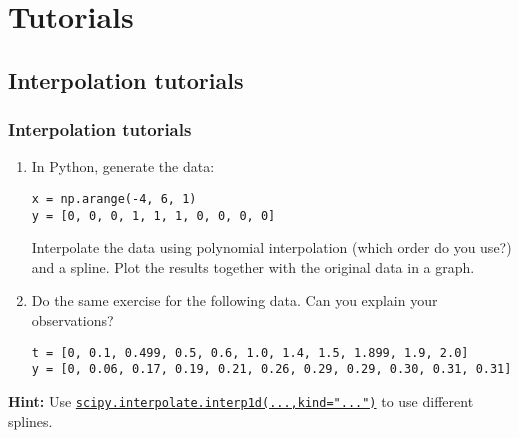 \section{Tutorials}
\subsection*{Interpolation tutorials}
\begin{frame}[fragile]
  \frametitle{Interpolation tutorials}
  \begin{enumerate}
    \item In Python, generate the data:
    \begin{lstlisting}
x = np.arange(-4, 6, 1)
y = [0, 0, 0, 1, 1, 1, 0, 0, 0, 0]
    \end{lstlisting}
    Interpolate the data using polynomial interpolation (which order do you use?) and a spline. Plot the results together with the original data in a graph.
    \item Do the same exercise for the following data. Can you explain your observations?
    \begin{lstlisting}
t = [0, 0.1, 0.499, 0.5, 0.6, 1.0, 1.4, 1.5, 1.899, 1.9, 2.0]
y = [0, 0.06, 0.17, 0.19, 0.21, 0.26, 0.29, 0.29, 0.30, 0.31, 0.31]
    \end{lstlisting}
  \end{enumerate}
  \textbf{Hint:} Use \href{https://docs.scipy.org/doc/scipy/reference/generated/scipy.interpolate.interp1d.html}{\lstinline{scipy.interpolate.interp1d(...,kind="...")}} to use different splines.
\end{frame}
